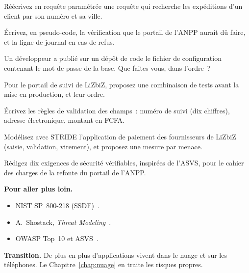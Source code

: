 \begin{boxexo}[title={\ding{45}\quad Exercice~19.4. Corriger \niveaumoyen}]
Réécrivez en requête paramétrée une requête qui recherche les expéditions
d'un client par son numéro et sa ville.
\end{boxexo}

\begin{boxexo}[title={\ding{45}\quad Exercice~19.5. Le paramètre id \niveaumoyen}]
Écrivez, en pseudo-code, la vérification que le portail de l'ANPP aurait
dû faire, et la ligne de journal en cas de refus.
\end{boxexo}

\begin{boxexo}[title={\ding{45}\quad Exercice~19.6. Secrets \niveaumoyen}]
Un développeur a publié sur un dépôt de code le fichier de configuration
contenant le mot de passe de la base. Que faites-vous, dans l'ordre~?
\end{boxexo}

\begin{boxexo}[title={\ding{45}\quad Exercice~19.7. Choisir les tests \niveaumoyen}]
Pour le portail de suivi de LiZbiZ, proposez une combinaison de tests
avant la mise en production, et leur ordre.
\end{boxexo}

\begin{boxexo}[title={\ding{45}\quad Exercice~19.8. Validation positive \niveaumoyen}]
Écrivez les règles de validation des champs~: numéro de suivi (dix
chiffres), adresse électronique, montant en FCFA.
\end{boxexo}

\begin{boxexo}[title={\ding{45}\quad Exercice~19.9. Modéliser \niveauexpert}]
Modélisez avec STRIDE l'application de paiement des fournisseurs de LiZbiZ
(saisie, validation, virement), et proposez une mesure par menace.
\end{boxexo}

\begin{boxexo}[title={\ding{45}\quad Exercice~19.10. Exigences \niveauexpert}]
Rédigez dix exigences de sécurité vérifiables, inspirées de l'ASVS, pour
le cahier des charges de la refonte du portail de l'ANPP.
\end{boxexo}

\bigskip

\begin{boxinfo}
\textbf{Pour aller plus loin.}
\begin{itemize}
    \item NIST SP~800-218 (SSDF)~\cite{nist800218}.
    \item A.~Shostack, \emph{Threat Modeling}~\cite{shostack2014}.
    \item OWASP Top~10 et ASVS~\cite{owasp2021top10,owasp2021asvs}.
\end{itemize}
\end{boxinfo}

\begin{boxinfo}
\textbf{Transition.} De plus en plus d'applications vivent dans le nuage
et sur les téléphones. Le Chapitre~\ref{chap:nuage} en traite les risques
propres.
\end{boxinfo}
